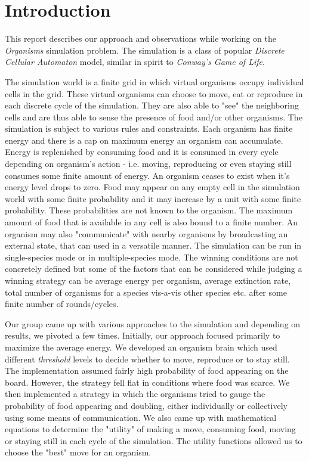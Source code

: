 \section{Introduction}

This report describes our approach and observations while working on the 
{\em Organisms} simulation problem. The simulation is a class of popular
{\em Discrete Cellular Automaton} model, similar in spirit to 
{\em Conway's Game of Life}.

The simulation world is a finite grid in which virtual organisms occupy 
individual cells in the grid. These virtual organisms can choose to move, 
eat or reproduce in each discrete cycle of the simulation. They are also 
able to "see" the neighboring cells and are thus able to sense the presence 
of food and/or other organisms. The simulation is subject to various rules 
and  constraints. Each organism has finite energy and there is a cap on 
maximum energy an organism can accumulate. Energy is replenished by consuming 
food and it is consumed in every cycle depending on organism's action - 
i.e. moving, reproducing or even staying still consumes some finite amount 
of energy.  An organism ceases to exist when it's energy level drops to zero.
Food may appear on any empty cell in the simulation world with some finite
probability and it may increase by a unit with some finite probability. 
These probabilities are not known to the organism. The maximum amount of 
food that is available in any cell is also bound to a finite number. 
An organism may also "communicate" with nearby organisms by broadcasting an 
external state, that can used in a versatile manner.
The simulation can be run in single-species mode or in multiple-species mode. 
The winning conditions are not concretely defined but some of the factors 
that can be considered while judging a winning strategy can be 
average energy per organism, average extinction rate, total number of
organisms for a species vis-a-vis other species etc. after some finite 
number of rounds/cycles.

Our group came up with various approaches to the simulation and depending on 
results, we pivoted a few times. Initially, our approach focused primarily 
to maximize the average energy. We developed an organism brain which used
different {\em threshold} levels to decide whether to move, reproduce or to 
stay still. The implementation assumed fairly high probability
of food appearing on the board. However, the strategy fell flat in conditions 
where food was scarce. We then implemented a strategy in which the organisms 
tried to gauge the probability of food appearing and doubling, either 
individually or collectively using some means of communication. We also came 
up with mathematical equations to determine the "utility" of making a move, 
consuming food, moving or staying still in each cycle of the simulation. 
The utility functions allowed us to choose the "best" move for an organism. 

